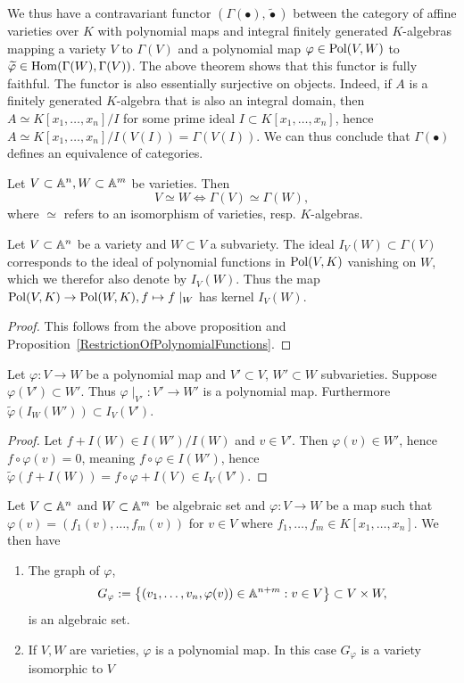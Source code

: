 \begin{remark}
    We thus have a contravariant functor $(\Gamma(\bullet),\widetilde{\bullet})$ between the category of affine varieties over $K$ with polynomial maps and integral finitely generated $K$-algebras mapping a variety $V$ to $\Gamma(V)$ and a polynomial map $\varphi \in \mathrm{Pol}(V,W)$ to $\widetilde{\varphi}\in \mathrm{Hom}(\Gamma(W),\Gamma(V))$. The above theorem shows that this functor is fully faithful. The functor is also essentially surjective on objects. Indeed, if $A$ is a finitely generated $K$-algebra that is also an integral domain, then $A\simeq K[x_1,\dots,x_n]/I$ for some prime ideal $I\subset K[x_1,\dots,x_n]$, hence $A\simeq K[x_1,\dots,x_n]/I(V(I))= \Gamma(V(I))$. We can thus conclude that $\Gamma(\bullet)$ defines an equivalence of categories. 
\end{remark}
\begin{corollary}\label{FunctorialityOfInducedAlgebraHomomorphism}
    Let $V\subset \mathbb{A}^n, W\subset \mathbb{A}^m$ be varieties. Then 
    $$V \simeq W \iff \Gamma(V)\simeq \Gamma(W),$$
    where $\simeq$ refers to an isomorphism of varieties, resp. $K$-algebras.
\end{corollary}
\begin{proposition}
    Let $V\subset \mathbb{A}^n$ be a variety and $W\subset V$ a subvariety. The ideal $I_V(W)\subset \Gamma(V)$ corresponds to the ideal of polynomial functions in $\mathrm{Pol}(V,K)$ vanishing on $W$, which we therefor also denote by $I_V(W)$. Thus the map $\mathrm{Pol}(V,K)\rightarrow \mathrm{Pol}(W,K), f \mapsto f\mid_W$ has kernel $I_V(W)$.
\end{proposition}
\begin{proof}
    This follows from the above proposition and Proposition~\ref{RestrictionOfPolynomialFunctions}.
\end{proof}
\begin{proposition}
    Let $\varphi : V \rightarrow W$ be a polynomial map and $V'\subset V$, $W'\subset W$ subvarieties. Suppose $\varphi(V')\subset W'$. Thus  $\varphi\mid_{V'} : V'\rightarrow W'$ is a polynomial map. Furthermore $\widetilde{\varphi}(I_W(W')) \subset I_V(V')$.  
\end{proposition}
\begin{proof}
    Let $f+I(W)\in I(W')/I(W)$ and $v\in V'$. Then $\varphi(v)\in W'$, hence $f\circ \varphi(v) = 0$, meaning $f\circ \varphi \in I(W')$, hence $\widetilde{\varphi}(f+I(W))=f\circ \varphi + I(V) \in I_V(V').$
\end{proof}
\begin{lemma}
    Let $V\subset \mathbb{A}^n$ and $W\subset \mathbb{A}^m$ be algebraic set and $\varphi: V\rightarrow W$ be a map such that $\varphi(v) = (f_1(v),\dots,f_m(v))$ for $v\in V$ where $f_1,\dots,f_m\in K[x_1,\dots,x_n]$. We then have 
    \begin{enumerate}
        \item The graph of $\varphi$,
        $$G_\varphi := \left\{ (v_1,\dots,v_n, \varphi(v)) \in \mathbb{A}^{n+m} : v\in V \right\}\subset V\times W,$$
        is an algebraic set.
        \item If $V,W$ are varieties, $\varphi$ is a polynomial map. In this case $G_\varphi$ is a variety isomorphic to $V$
    \end{enumerate}
\end{lemma}
